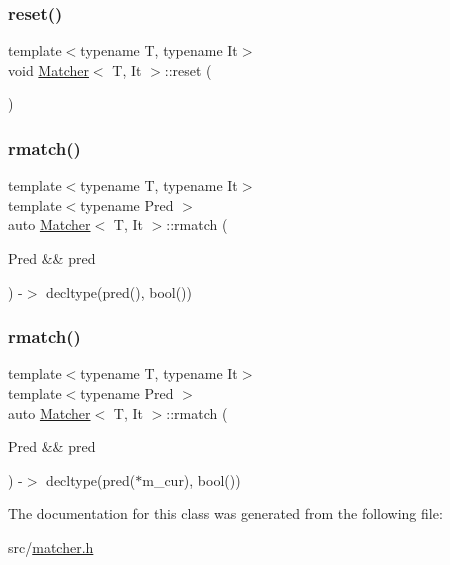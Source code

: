 \mbox{\label{class_matcher_a18de8d97996c28deb6ac787f2a0981a6}} 
\subsubsection{\texorpdfstring{reset()}{reset()}\hspace{0.1cm}{\footnotesize\ttfamily [2/2]}}
{\footnotesize\ttfamily template$<$typename T, typename It$>$ \\
void \hyperlink{class_matcher}{Matcher}$<$ T, It $>$\+::reset (\begin{DoxyParamCaption}{ }\end{DoxyParamCaption})\hspace{0.3cm}{\ttfamily [inline]}}

\mbox{\label{class_matcher_a016cf13b6cf1119494a9723fb9419fd4}} 
\subsubsection{\texorpdfstring{rmatch()}{rmatch()}\hspace{0.1cm}{\footnotesize\ttfamily [1/2]}}
{\footnotesize\ttfamily template$<$typename T, typename It$>$ \\
template$<$typename Pred $>$ \\
auto \hyperlink{class_matcher}{Matcher}$<$ T, It $>$\+::rmatch (\begin{DoxyParamCaption}\item[{Pred \&\&}]{pred }\end{DoxyParamCaption}) -\/$>$ decltype(pred(), bool())
  \hspace{0.3cm}{\ttfamily [inline]}}

\mbox{\label{class_matcher_ad0b897b87cede7752c385e7d55bcaff4}} 
\subsubsection{\texorpdfstring{rmatch()}{rmatch()}\hspace{0.1cm}{\footnotesize\ttfamily [2/2]}}
{\footnotesize\ttfamily template$<$typename T, typename It$>$ \\
template$<$typename Pred $>$ \\
auto \hyperlink{class_matcher}{Matcher}$<$ T, It $>$\+::rmatch (\begin{DoxyParamCaption}\item[{Pred \&\&}]{pred }\end{DoxyParamCaption}) -\/$>$ decltype(pred($\ast$m\+\_\+cur), bool())
  \hspace{0.3cm}{\ttfamily [inline]}}



The documentation for this class was generated from the following file\+:\begin{DoxyCompactItemize}
\item 
src/\hyperlink{matcher_8h}{matcher.\+h}\end{DoxyCompactItemize}
